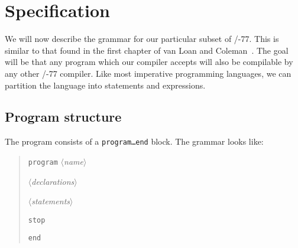 \section{Specification}
We will now describe the grammar for our particular subset of \FORTRAN/-77.
This is similar to that found in the first chapter of van Loan and
Coleman~\cite{vanloan1987handbook}. The goal will be that any program
which our compiler accepts will also be compilable by any other \FORTRAN/-77 compiler.
Like most imperative programming languages, we can partition the
language into statements and expressions.

\subsection{Program structure}
The program consists of a \texttt{program\dots end} block. The grammar
looks like:

\begin{quotation}
\noindent\texttt{program} $\langle$\textit{name\/}$\rangle$

$\langle$\textit{declarations\/}$\rangle$

$\langle$\textit{statements\/}$\rangle$

\noindent\texttt{stop}

\noindent\texttt{end}
\end{quotation}

